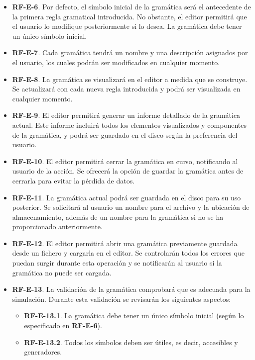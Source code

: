 \begin{itemize}
\item \textbf{RF-E-6}. Por defecto, el símbolo inicial de la gramática será el antecedente de la primera regla gramatical introducida. No obstante, el editor permitirá que el usuario lo modifique posteriormente si lo desea. La gramática debe tener un único símbolo inicial.

\item \textbf{RF-E-7}. Cada gramática tendrá un nombre y una descripción asignados por el usuario, los cuales podrán ser modificados en cualquier momento.

\item \textbf{RF-E-8}. La gramática se visualizará en el editor a medida que se construye. Se actualizará con cada nueva regla introducida y podrá ser visualizada en cualquier momento.

\item \textbf{RF-E-9}. El editor permitirá generar un informe detallado de la gramática actual. Este informe incluirá todos los elementos visualizados y componentes de la gramática, y podrá ser guardado en el disco según la preferencia del usuario.

\item \textbf{RF-E-10}. El editor permitirá cerrar la gramática en curso, notificando al usuario de la acción. Se ofrecerá la opción de guardar la gramática antes de cerrarla para evitar la pérdida de datos.

\item \textbf{RF-E-11}. La gramática actual podrá ser guardada en el disco para su uso posterior. Se solicitará al usuario un nombre para el archivo y la ubicación de almacenamiento, además de un nombre para la gramática si no se ha proporcionado anteriormente.

\item \textbf{RF-E-12}. El editor permitirá abrir una gramática previamente guardada desde un fichero y cargarla en el editor. Se controlarán todos los errores que puedan surgir durante esta operación y se notificarán al usuario si la gramática no puede ser cargada.

\item \textbf{RF-E-13}. La validación de la gramática comprobará que es adecuada para la simulación. Durante esta validación se revisarán los siguientes aspectos:
\begin{itemize}
    \item  \textbf{RF-E-13.1}. La gramática debe tener un único símbolo inicial (según lo especificado en \textbf{RF-E-6}).
    \item  \textbf{RF-E-13.2}. Todos los símbolos deben ser útiles, es decir, accesibles y generadores.
\end{itemize}


\end{itemize}
